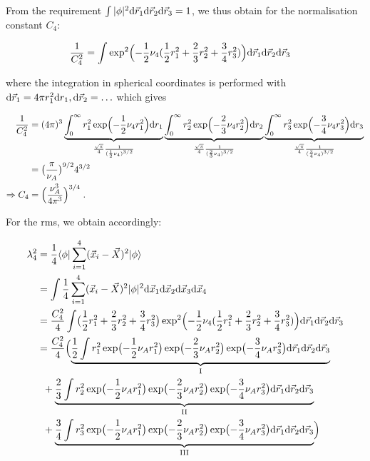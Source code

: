 \documentclass[a4paper,11pt]{scrartcl} %
\begin{document}
\begin{appendix}
\noindent From the requirement $\int|\phi|^2{\rm d}\vec{r}_{1}{\rm d}\vec{r}_{2}{\rm d}\vec{r}_{3} = 1$, we thus obtain for the normalisation constant $C_4$: 

\begin{align}
	{1\over C_{4}^{2}} &= \int \exp^{2}\Bigl(-{1\over 2} \nu_{4} ({1\over 2}r_{1}^{2} + {2\over 3} r_{2}^{2} + {3\over 4}r_{3}^{2}) \Bigr) {\rm d}\vec{r}_{1}{\rm d}\vec{r}_{2}{\rm d}\vec{r}_{3}
\end{align}

\noindent where the integration in spherical coordinates is performed with ${\rm d}\vec{r}_{1} = 4\pi r_{1}^{2}{\rm d}r_{1},  {\rm d}\vec{r}_{2} = \ldots$ which gives

\begin{align}
	{1\over C_{4}^{2}} &= (4\pi)^{3} \underbrace{\int_{0}^{\infty} r_{1}^{2}\exp\Bigl(-{1\over 2} \nu_{4}  r_{1}^{2}  \Bigr)  {\rm d}r_{1}}_{{\sqrt{\pi} \over 4} {1 \over ({1\over 2} \nu_{4})^{3/2}}  }
							\underbrace{\int_{0}^{\infty} r_{2}^{2}\exp\Bigl(-{2\over 3} \nu_{4}  r_{2}^{2}  \Bigr)  {\rm d}r_{2}}_{{\sqrt{\pi} \over 4} {1 \over ({2\over 3} \nu_{4})^{3/2}}  }
							\underbrace{\int_{0}^{\infty} r_{3}^{2}\exp\Bigl(-{3\over 4} \nu_{4}  r_{3}^{2}  \Bigr)  {\rm d}r_{3}}_{{\sqrt{\pi} \over 4} {1 \over ({3\over 4} \nu_{4})^{3/2}}  } \\
		&= \bigl({\pi \over \nu_{A}}\bigr)^{9/2} 4^{3/2} \\
	\Rightarrow C_{4} &= \Bigl({\nu_{A}^{3} \over 4 \pi^{3}}\Bigr)^{3/4} \;.
\end{align}

\noindent For the rms, we obtain accordingly:


\begin{align}
	\lambda_{4}^{2} &= {1 \over 4} \langle \phi \vert   \sum_{i=1}^{4}(\vec{x}_{i} - \vec{X})^2 \vert \phi \rangle \\
	&= \int {1\over 4}  \sum_{i=1}^{4}(\vec{x}_{i} - \vec{X})^2 |\phi|^2 {\rm d}\vec{x}_{1}{\rm d}\vec{x}_{2}{\rm d}\vec{x}_{3}{\rm d}\vec{x}_{4} \\
	 &= {C_4^2 \over 4}  \int \bigl({1\over 2}r_{1}^{2} + {2\over 3} r_{2}^{2} + {3\over 4}r_{3}^{2} \bigr) \exp^{2}\Bigl(-{1\over 2} \nu_{4} ({1\over 2}r_{1}^{2} + {2\over 3} r_{2}^{2} + {3\over 4}r_{3}^{2}) \Bigr) {\rm d}\vec{r}_{1}{\rm d}\vec{r}_{2}{\rm d}\vec{r}_{3} \\
	&= {C_4^2 \over 4} \Bigl(\underbrace{{1\over 2} \int r_{1}^2 \exp\bigl(-{1\over2} \nu_A r_{1}^{2}\bigr) \exp\bigl(-{2\over3} \nu_A r_{2}^{2}\bigr) \exp\bigl(-{3\over4} \nu_A r_{3}^{2}\bigr) {\rm d}\vec{r}_{1}{\rm d}\vec{r}_{2}{\rm d}\vec{r}_{3}}_{\rm I} \\
	&\;\;+ \underbrace{{2\over 3} \int r_{2}^2 \exp\bigl(-{1\over2} \nu_A r_{1}^{2}\bigr) \exp\bigl(-{2\over3} \nu_A r_{2}^{2}\bigr) \exp\bigl(-{3\over4} \nu_A r_{3}^{2}\bigr) {\rm d}\vec{r}_{1}{\rm d}\vec{r}_{2}{\rm d}\vec{r}_{3}}_{\rm II} \\
	&\;\;+ \underbrace{{3\over 4} \int r_{3}^2 \exp\bigl(-{1\over2} \nu_A r_{1}^{2}\bigr) \exp\bigl(-{2\over3} \nu_A r_{2}^{2}\bigr) \exp\bigl(-{3\over4} \nu_A r_{3}^{2}\bigr) {\rm d}\vec{r}_{1}{\rm d}\vec{r}_{2}{\rm d}\vec{r}_{3}}_{\rm III}
				 \Bigr)
\end{align}


\end{appendix}
\end{document}
